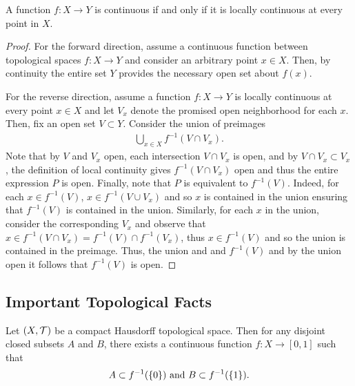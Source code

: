 \documentclass[../sean_thesis.tex]{subfiles}
\begin{document}
\begin{claim}
	A function $f: X \to Y$ is continuous if and only if it is locally continuous at every point in $X$.
\end{claim}
\begin{proof}
	For the forward direction, assume a continuous function between topological spaces $f: X \to Y$ and consider an arbitrary point $x \in X$. Then, by continuity the entire set $Y$ provides the necessary open set about $f(x)$.
	
	For the reverse direction, assume a function $f: X \to Y$ is locally continuous at every point $x \in X$ and let $V_x$ denote the promised open neighborhood for each $x$. Then, fix an open set $V \subset Y$. Consider the union of preimages
	\begin{align*}
		\bigcup_{x \in X} f^{-1}(V \cap V_x).
	\end{align*}
	Note that by $V$ and $V_x$ open, each intersection $V \cap V_x$ is open, and by $V \cap V_x \subset V_x$, the definition of local continuity gives $f^{-1}(V \cap V_x)$ open and thus the entire expression $P$ is open. Finally, note that $P$ is equivalent to $f^{-1}(V)$. Indeed, for each $x \in f^{-1}(V)$, $x \in f^{-1}(V \cup V_x)$ and so $x$ is contained in the union ensuring that $f^{-1}(V)$ is contained in the union. Similarly, for each $x$ in the union, consider the corresponding $V_x$ and observe that $x \in f^{-1}(V \cap V_x) = f^{-1}(V) \cap f^{-1}(V_x)$, thus $x \in f^{-1}(V)$ and so the union is contained in the preimage. Thus, the union and and $f^{-1}(V)$ and by the union open it follows that $f^{-1}(V)$ is open.
\end{proof}

\subsection{Important Topological Facts}
%
%


\begin{theorem}
	Let $(X, \mathcal{T})$ be a compact Hausdorff topological space. Then for any disjoint closed subsets $A$ and $B$, there exists a continuous function $f: X \to [0,1]$ such that
	\begin{equation*}
		A \subset f^{-1}(\left\{0\right\}) \text{ and }
		B \subset f^{-1}(\left\{1\right\}).
	\end{equation*}
\end{theorem}
\end{document}
